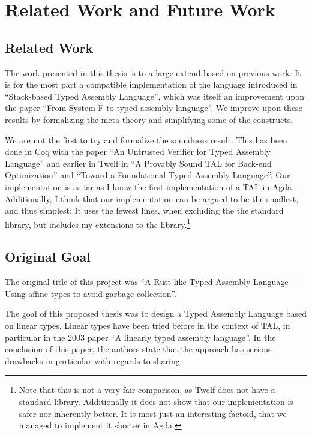 \chapter{Related Work and Future Work}
\label{chap:future}

\section{Related Work}

The work presented in this thesis is to a large extend based on previous
work. It is for the most part a compatible implementation of the language
introduced in ``Stack-based Typed Assembly Language''\cite{STAL}, which was
itself an improvement upon the paper ``From System F to typed assembly
language''\cite{TAL}. We improve upon these results by formalizing the
meta-theory and simplifying some of the constructs.

We are not the first to try and formalize the soundness result. This has been
done in Coq with the paper ``An Untrusted Verifier for Typed Assembly
Language''\cite{untrusted} and earlier in Twelf in ``A Provably Sound TAL for
Back-end Optimization''\cite{provably} and ``Toward a Foundational Typed
Assembly Language''\cite{toward}. Our implementation is as far as I know the
first implementation of a TAL in Agda. Additionally, I think that our
implementation can be argued to be the smallest, and thus simplest: It uses the
fewest lines, when excluding the the standard library, but includes my
extensions to the library.\footnote{Note that this is not a very fair
  comparison, as Twelf does not have a standard library. Additionally it does
  not show that our implementation is safer nor inherently better. It is most
  just an interesting factoid, that we managed to implement it shorter in Agda.}

\section{Original Goal}

The original title of this project was ``A Rust-like Typed Assembly Language --
Using affine types to avoid garbage collection''.

The goal of this proposed thesis was to design a Typed Assembly Language based
on linear types. Linear types have been tried before in the context of TAL, in
particular in the 2003 paper ``A linearly typed assembly
language''\cite{ltal}. In the conclusion of this paper, the authors state that
the approach has serious drawbacks in particular with regards to sharing.

